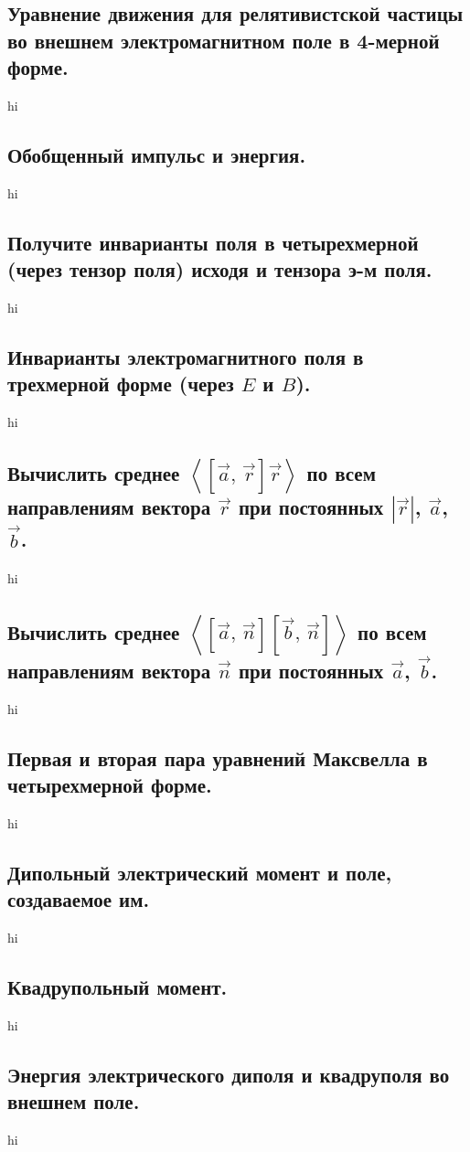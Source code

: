 \documentclass[a4paper,12pt]{article}
\begin{document}
\subsection{Уравнение движения для релятивистской частицы во внешнем
электромагнитном поле в 4-мерной форме.}
hi
\subsection{Обобщенный импульс и энергия.}
hi
\subsection{Получите инварианты поля в четырехмерной (через тензор поля)
исходя и тензора э-м поля.}
hi
\subsection{Инварианты электромагнитного поля в трехмерной форме (через $E$ и
$B$).}
hi
\subsection{Вычислить среднее $\left<\left[ \vec{a},\,\vec{r} \right] \vec{r}
\right>$ по всем направлениям вектора $\vec{r}$ при постоянных  $\left| 
\vec{r}\right| $, $\vec{a}$, $\vec{b}$.}
hi
\subsection{Вычислить среднее $\left<\left[ \vec{a},\,\vec{n} \right]
\left[ \vec{b},\,\vec{n} \right]
\right>$ по всем направлениям вектора $\vec{n}$ при постоянных 
$\vec{a}$, $\vec{b}$.}
hi
\subsection{Первая и вторая пара уравнений Максвелла в четырехмерной форме.}
hi
\subsection{Дипольный электрический момент и поле, создаваемое им.}
hi
\subsection{Квадрупольный момент.}
hi
\subsection{Энергия электрического диполя и квадруполя во внешнем поле.}
hi
\end{document}
